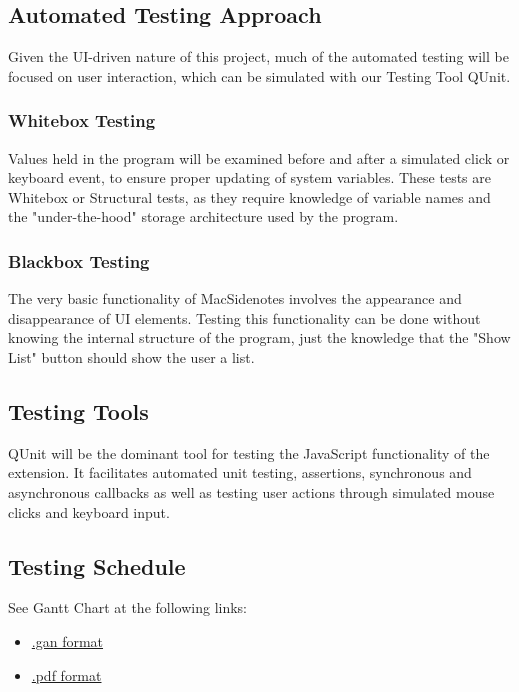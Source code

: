 \documentclass[12pt, titlepage]{article}
\begin{document}
\subsection{Automated Testing Approach}

Given the UI-driven nature of this project, much of the automated testing 
will be focused on user interaction, which can be simulated with our Testing 
Tool QUnit.
\subsubsection{Whitebox Testing}
Values held in the program will be examined before and after a 
simulated click or keyboard event, to ensure proper updating of system 
variables. These tests are Whitebox or Structural tests, as they require 
knowledge of variable names and the "under-the-hood" storage architecture used 
by the program.
\subsubsection{Blackbox Testing}
The very basic functionality of MacSidenotes involves the appearance and 
disappearance of UI elements. Testing this functionality can be done without 
knowing the internal structure of the program, just the knowledge that the 
"Show List" button should show the user a list.

\subsection{Testing Tools}

QUnit will be the dominant tool for testing the JavaScript functionality of the 
extension. It facilitates automated unit testing, assertions, synchronous and 
asynchronous callbacks as well as testing user actions through simulated mouse 
clicks and keyboard input.

\subsection{Testing Schedule}
		
See Gantt Chart at the following links:

\begin{itemize}
	\item 
	\href{https://gitlab.cas.mcmaster.ca/macsidenotes/macsidenotes/blob/master/ProjectSchedule/MacSidenotesProjectSchedule.gan}{.gan
	 format}
	\item 
	\href{https://gitlab.cas.mcmaster.ca/macsidenotes/macsidenotes/blob/master/ProjectSchedule/MacSidenotesProjectSchedule.pdf}{.pdf
	 format}
\end{itemize}
\end{document}
